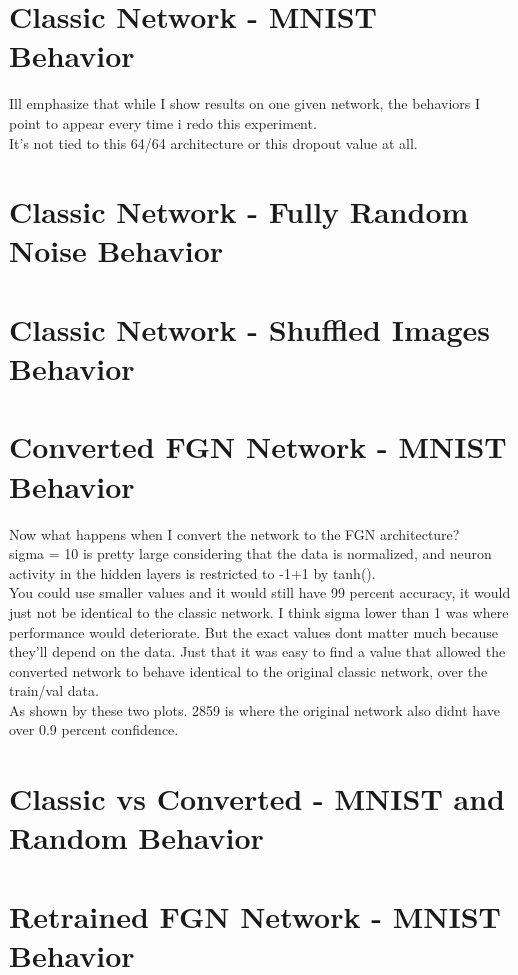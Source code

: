 \documentclass{article}
\begin{document}
\section{Classic Network - MNIST Behavior}
Ill emphasize that while I show results on one given network, the behaviors I point to appear every time i redo this experiment. \\
It's not tied to this 64/64 architecture or this dropout value at all.\\

\section{Classic Network - Fully Random Noise Behavior}

\section{Classic Network - Shuffled Images Behavior}

\section{Converted FGN Network - MNIST Behavior}
Now what happens when I convert the network to the FGN architecture?\\
sigma = 10 is pretty large considering that the data is normalized, and neuron activity in the hidden layers is restricted to -1+1 by tanh().\\
You could use smaller values and it would still have 99 percent accuracy, it would just not be identical to the classic network. I think sigma lower than 1 was where performance would deteriorate. But the exact values dont matter much because they'll depend on the data. Just that it was easy to find a value that allowed the converted network to behave identical to the original classic network, over the train/val data.\\
As shown by these two plots. 2859 is where the original network also didnt have over 0.9 percent confidence.

\section{Classic vs Converted - MNIST and Random Behavior}

\section{Retrained FGN Network - MNIST Behavior}
\end{document}
